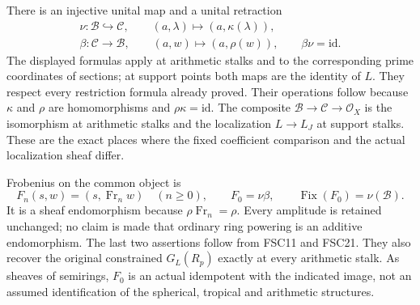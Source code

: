 There is an injective unital map and a unital retraction
\begin{equation}\tag{FSC21}
 \begin{gathered}
 \nu:\mathcal B\hookrightarrow\mathcal C,\qquad
 (a,\lambda)\longmapsto(a,\kappa(\lambda)),\\
 \beta:\mathcal C\longrightarrow\mathcal B,\qquad
 (a,w)\longmapsto(a,\rho(w)),\qquad \beta\nu=\mathrm{id}.
 \end{gathered}
\end{equation}
The displayed formulas apply at arithmetic stalks and to the
corresponding prime coordinates of sections; at support points
both maps are the identity of $L$. They respect every restriction
formula already proved. Their operations follow because $\kappa$
and $\rho$ are homomorphisms and $\rho\kappa=\mathrm{id}$.
The composite $\mathcal B\to\mathcal C\to\mathcal O_X$ is the
isomorphism at arithmetic stalks and the localization $L\to L_J$
at support stalks. These are the exact places where the fixed
coefficient comparison and the actual localization sheaf differ.

Frobenius on the common object is
\begin{equation}\tag{FSC22}
 F_n(s,w)=(s,\operatorname{Fr}_n w)\quad(n\ge0),\qquad
 F_0=\nu\beta,
 \qquad \operatorname{Fix}(F_0)=\nu(\mathcal B).
\end{equation}
It is a sheaf endomorphism because $\rho\operatorname{Fr}_n=\rho$.
Every amplitude is retained unchanged; no claim is made that ordinary
ring powering is an additive endomorphism. The last two assertions
follow from FSC11 and FSC21. They also recover the original constrained
$G_L(R_p)$ exactly at every arithmetic stalk. As sheaves of semirings,
$F_0$ is an actual idempotent with the indicated image, not an assumed
identification of the spherical, tropical and arithmetic structures.

